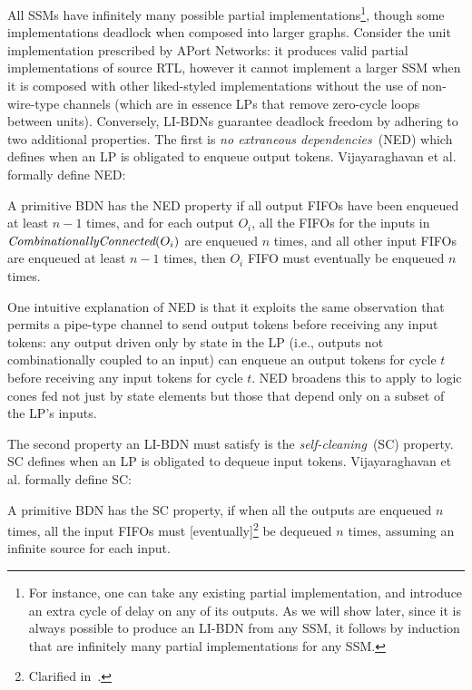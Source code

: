 All SSMs have infinitely many possible partial implementations\footnote{For
instance, one can take any existing partial implementation, and introduce an
extra cycle of delay on any of its outputs. As we will show later, since it is
always possible to produce an LI-BDN from any SSM, it follows by induction that are infinitely many partial implementations
for any SSM.}, though some implementations deadlock when composed into larger graphs.
Consider the unit implementation prescribed by APort Networks: it produces valid partial implementations of
source RTL, however it cannot implement a larger SSM when it is composed
with other liked-styled implementations without the use of non-wire-type channels (which are in essence LPs that remove zero-cycle loops between units).
Conversely, LI-BDNs guarantee deadlock freedom by adhering to two additional properties.
The first is \emph{no extraneous dependencies}~(NED) which defines when an LP is obligated to enqueue output tokens. Vijayaraghavan et al.\cite{LIBDN} formally define NED:

\begin{widequote}
A primitive BDN has the NED property if all output FIFOs have been enqueued at least $n-1$ times,
and for each output $O_i$, all the FIFOs for the inputs in $\emph{CombinationallyConnected}(O_i)$
are enqueued $n$ times, and all other input FIFOs are enqueued at least $n-1$ times, then $O_i$ FIFO
must eventually be enqueued $n$ times.
\end{widequote}\label{def:ned}

One intuitive explanation of NED is that it exploits the same observation that
permits a pipe-type channel to send output tokens before receiving any input
tokens: any output driven only by state in the LP (i.e., outputs not
combinationally coupled to an input) can enqueue an output tokens for cycle
$t$ before receiving any input tokens for cycle $t$. NED broadens this to apply to logic cones fed not just by state
elements but those that depend only on a subset of the LP's inputs.

The second property an LI-BDN must satisfy is the \emph{self-cleaning}~(SC) property. SC 
defines when an LP is obligated to dequeue input tokens. Vijayaraghavan et al.\cite{LIBDN} formally define SC:

\begin{widequote}
A primitive BDN has the SC property, if when all the
outputs are enqueued $n$ times, all the input FIFOs must
[eventually]\footnote{Clarified in~\cite{LIBDNMasters}.} be dequeued $n$ times, assuming an infinite source for each
input.
\end{widequote}\label{def:sc}

